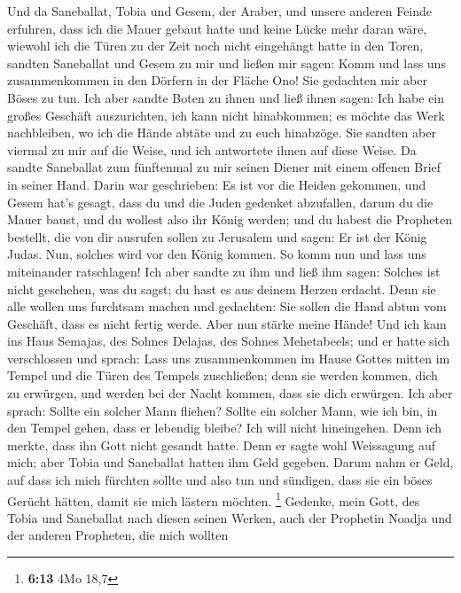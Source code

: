  Und da Saneballat, Tobia und Gesem, der Araber, und
unsere anderen Feinde erfuhren, dass ich die Mauer gebaut hatte und
keine Lücke mehr daran wäre, wiewohl ich die Türen zu der Zeit noch
nicht eingehängt hatte in den Toren,  sandten Saneballat
und Gesem zu mir und ließen mir sagen: Komm und lass uns zusammenkommen
in den Dörfern in der Fläche Ono! Sie gedachten mir aber Böses zu tun.
 Ich aber sandte Boten zu ihnen und ließ ihnen sagen: Ich
habe ein großes Geschäft auszurichten, ich kann nicht hinabkommen; es
möchte das Werk nachbleiben, wo ich die Hände abtäte und zu euch
hinabzöge.  Sie sandten aber viermal zu mir auf die Weise,
und ich antwortete ihnen auf diese Weise.  Da sandte
Saneballat zum fünftenmal zu mir seinen Diener mit einem offenen Brief
in seiner Hand.  Darin war geschrieben: Es ist vor die
Heiden gekommen, und Gesem hat's gesagt, dass du und die Juden gedenket
abzufallen, darum du die Mauer baust, und du wollest also ihr König
werden;  und du habest die Propheten bestellt, die von dir
ausrufen sollen zu Jerusalem und sagen: Er ist der König Judas. Nun,
solches wird vor den König kommen. So komm nun und lass uns miteinander
ratschlagen!  Ich aber sandte zu ihm und ließ ihm sagen:
Solches ist nicht geschehen, was du sagst; du hast es aus deinem Herzen
erdacht.  Denn sie alle wollen uns furchtsam machen und
gedachten: Sie sollen die Hand abtun vom Geschäft, dass es nicht fertig
werde. Aber nun stärke meine Hände!  Und ich kam ins Haus
Semajas, des Sohnes Delajas, des Sohnes Mehetabeels; und er hatte sich
verschlossen und sprach: Lass uns zusammenkommen im Hause Gottes mitten
im Tempel und die Türen des Tempels zuschließen; denn sie werden kommen,
dich zu erwürgen, und werden bei der Nacht kommen, dass sie dich
erwürgen.  Ich aber sprach: Sollte ein solcher Mann
fliehen? Sollte ein solcher Mann, wie ich bin, in den Tempel gehen, dass
er lebendig bleibe? Ich will nicht hineingehen.  Denn ich
merkte, dass ihn Gott nicht gesandt hatte. Denn er sagte wohl Weissagung
auf mich; aber Tobia und Saneballat hatten ihm Geld gegeben.
 Darum nahm er Geld, auf dass ich mich fürchten sollte
und also tun und sündigen, dass sie ein böses Gerücht hätten, damit sie
mich lästern möchten. \footnote{\textbf{6:13} 4Mo 18,7} 
Gedenke, mein Gott, des Tobia und Saneballat nach diesen seinen Werken,
auch der Prophetin Noadja und der anderen Propheten, die mich wollten
